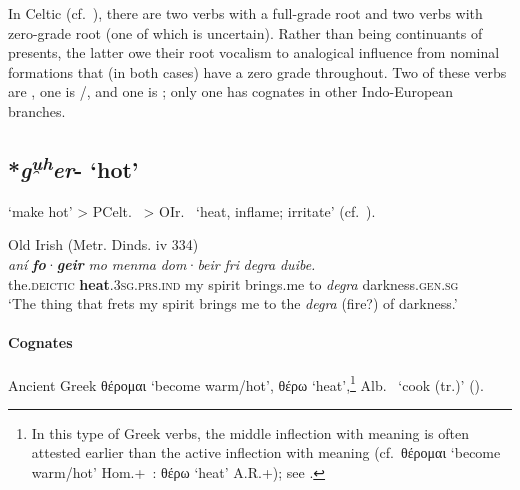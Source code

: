 \documentclass[output=paper,colorlinks,citecolor=brown]{langscibook}
\begin{document}
In Celtic (cf.\ \citealt[36--37]{Schumacher2004}), there are two verbs with a full-grade root and two verbs with zero-grade root (one of which is uncertain). Rather than being continuants of  presents, the latter owe their root vocalism to analogical influence from nominal formations that (in both cases) have a zero grade throughout. Two of these verbs are , one is /, and one is ; only one has cognates in other Indo-European branches.

\subsection{*\textit{g\textsuperscript{u̯h}er}- ‘hot’}
\label{sec:STPhot}

 ‘make hot’ > PCelt.\  > OIr.\   ‘heat, inflame; irritate’ (cf.\ \citealt[372--373]{Schumacher2004}).

\begin{exe}
    \ex Old Irish (Metr. Dinds. iv 334)\label{ex:STPhot}\\
        \gll \textit{aní} {\textbf{\textit{fo}}·\textbf{\textit{geir}} } \textit{mo} \textit{menma} \textit{dom}·\textit{beir} \textit{fri} \textit{degra} \textit{duibe.} \\
        the.\textsc{deictic} \textbf{heat}.\textsc{3sg.prs.ind} my spirit brings.me to \textit{degra} darkness.\textsc{gen.sg} \\
        \glt ‘The thing that frets my spirit brings me to the \textit{degra} (fire?) of darkness.’ \\
\end{exe}

\paragraph*{Cognates} 

Ancient Greek θέρομαι ‘become warm/hot’, θέρω   ‘heat’,\footnote{\label{fn:theromai}In this type of Greek verbs, the middle inflection with  meaning is often attested earlier than the active inflection with  meaning (cf.\ {θέρομαι} ‘become warm/hot’ \mbox{Hom.+ :} {θέρω}  ‘heat’ A.R.+); see \citet[155]{Rau2009}.} Alb.\  ‘cook (tr.)’ ().
\end{document}

